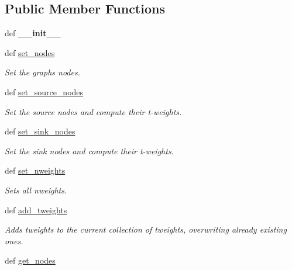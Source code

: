 \subsection*{Public Member Functions}
\begin{DoxyCompactItemize}
\item 
\hypertarget{classmedpy_1_1graphcut_1_1graph_1_1Graph_ada7c2ff7b950159feab5a4d2f69464c9}{
def {\bfseries \_\-\_\-init\_\-\_\-}}
\label{classmedpy_1_1graphcut_1_1graph_1_1Graph_ada7c2ff7b950159feab5a4d2f69464c9}

\item 
def \hyperlink{classmedpy_1_1graphcut_1_1graph_1_1Graph_a41b5d54706b84e5a11523da1ba626848}{set\_\-nodes}
\begin{DoxyCompactList}\small\item\em Set the graphs nodes. \end{DoxyCompactList}\item 
def \hyperlink{classmedpy_1_1graphcut_1_1graph_1_1Graph_af1726ca138ac2522b5fe98f5ae5b157f}{set\_\-source\_\-nodes}
\begin{DoxyCompactList}\small\item\em Set the source nodes and compute their t-\/weights. \end{DoxyCompactList}\item 
def \hyperlink{classmedpy_1_1graphcut_1_1graph_1_1Graph_a54b1a1643e1eedda40c121f9b3e7577d}{set\_\-sink\_\-nodes}
\begin{DoxyCompactList}\small\item\em Set the sink nodes and compute their t-\/weights. \end{DoxyCompactList}\item 
def \hyperlink{classmedpy_1_1graphcut_1_1graph_1_1Graph_a197d5cca5684cebfbabb07f13c4c0175}{set\_\-nweights}
\begin{DoxyCompactList}\small\item\em Sets all nweights. \end{DoxyCompactList}\item 
def \hyperlink{classmedpy_1_1graphcut_1_1graph_1_1Graph_a5a99c76efac37bc31acf495873933122}{add\_\-tweights}
\begin{DoxyCompactList}\small\item\em Adds tweights to the current collection of tweights, overwriting already existing ones. \end{DoxyCompactList}\item 
def \hyperlink{classmedpy_1_1graphcut_1_1graph_1_1Graph_a1cf8f8077a620ae6fd90b327f689d5e5}{get\_\-nodes}

\end{DoxyCompactItemize}
